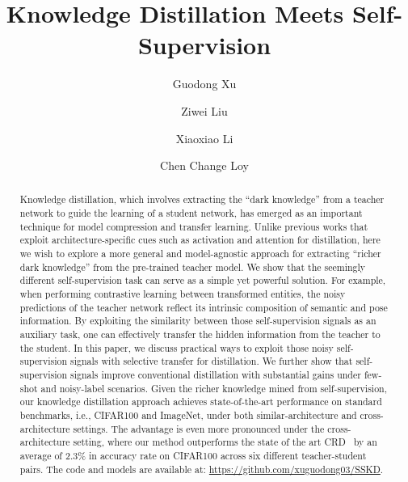 \documentclass[runningheads]{llncs}
\newcommand{\ie}{i.e.}
\begin{document}
\pagestyle{headings}
\mainmatter
\def\ECCVSubNumber{898}  

\title{Knowledge Distillation Meets Self-Supervision} 



\author{Guodong Xu \and
Ziwei Liu \and
Xiaoxiao Li \and
Chen Change Loy}




\maketitle



\begin{abstract}

Knowledge distillation, which involves extracting the ``dark knowledge'' from a teacher network to guide the learning of a student network, has emerged as an important technique for model compression and transfer learning. Unlike previous works that exploit architecture-specific cues such as activation and attention for distillation, here we wish to explore a more general and model-agnostic approach for extracting ``richer dark knowledge'' from the pre-trained teacher model. 
We show that the seemingly different self-supervision task can serve as a simple yet powerful solution. 
For example, when performing contrastive learning between transformed entities, the noisy predictions of the teacher network reflect its intrinsic composition of semantic and pose information. By exploiting the similarity between those self-supervision signals as an auxiliary task, one can effectively transfer the hidden information from the teacher to the student. 
In this paper, we discuss practical ways to exploit those noisy self-supervision signals with selective transfer for distillation. We further show that self-supervision signals improve conventional distillation with substantial gains under few-shot and noisy-label scenarios. 
Given the richer knowledge mined from self-supervision, our knowledge distillation approach achieves state-of-the-art performance on standard benchmarks, \ie, CIFAR100 and ImageNet, under both similar-architecture and cross-architecture settings. The advantage is even more pronounced under the cross-architecture setting, where our method outperforms the state of the art CRD~\cite{crd} by an average of 2.3\% in accuracy rate on CIFAR100 across six different teacher-student pairs. The code and models are available at: \href{https://github.com/xuguodong03/SSKD}{https://github.com/xuguodong03/SSKD}.
    


\end{abstract} 
\end{document}
